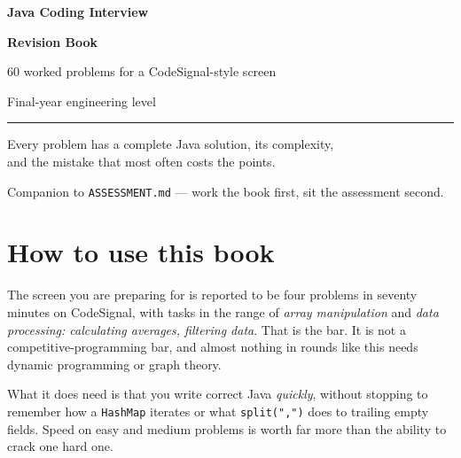 \documentclass[11pt,a4paper]{article}
\begin{document}
\begin{titlepage}
\centering
\vspace*{3.5cm}
{\Huge\bfseries Java Coding Interview\par}
\vspace{0.5cm}
{\Huge\bfseries Revision Book\par}
\vspace{1.2cm}
{\large\color{muted} 60 worked problems for a CodeSignal-style screen\par}
\vspace{0.3cm}
{\large\color{muted} Final-year engineering level\par}
\vspace{2.5cm}
\rule{8cm}{1pt}\par
\vspace{2.5cm}
{\color{muted}
Every problem has a complete Java solution, its complexity,\\[2pt]
and the mistake that most often costs the points.\par}
\vfill
{\small\color{muted} Companion to \texttt{ASSESSMENT.md} --- work the book first, sit the assessment second.\par}
\end{titlepage}

\setcounter{page}{1}
\section*{How to use this book}

The screen you are preparing for is reported to be four problems in seventy
minutes on CodeSignal, with tasks in the range of \emph{array manipulation} and
\emph{data processing: calculating averages, filtering data}. That is the bar.
It is not a competitive-programming bar, and almost nothing in rounds like this
needs dynamic programming or graph theory.

What it does need is that you write correct Java \emph{quickly}, without
stopping to remember how a \texttt{HashMap} iterates or what
\texttt{split(",")} does to trailing empty fields. Speed on easy and medium
problems is worth far more than the ability to crack one hard one.
\end{document}
